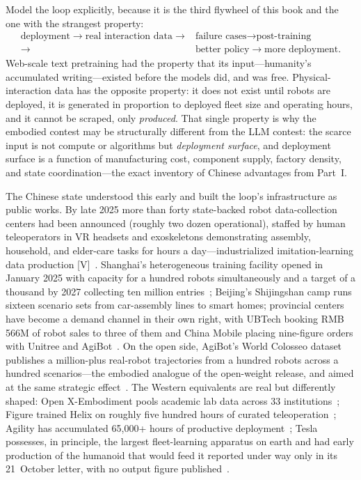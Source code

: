 Model the loop explicitly, because it is the third flywheel of this book and the one with the strangest property:
\begin{align*}
\text{deployment} \rightarrow \text{real interaction data} \rightarrow{}& \text{failure cases} \rightarrow \text{post-training}\\
\rightarrow{}& \text{better policy} \rightarrow \text{more deployment}.
\end{align*}
Web-scale text pretraining had the property that its input---humanity's accumulated writing---existed before the models did, and was free. Physical-interaction data has the opposite property: it does not exist until robots are deployed, it is generated in proportion to deployed fleet size and operating hours, and it cannot be scraped, only \emph{produced}. That single property is why the embodied contest may be structurally different from the LLM contest: the scarce input is not compute or algorithms but \emph{deployment surface}, and deployment surface is a function of manufacturing cost, component supply, factory density, and state coordination---the exact inventory of Chinese advantages from Part~I.

The Chinese state understood this early and built the loop's infrastructure as public works. By late 2025 more than forty state-backed robot data-collection centers had been announced (roughly two dozen operational), staffed by human teleoperators in VR headsets and exoskeletons demonstrating assembly, household, and elder-care tasks for hours a day---industrialized imitation-learning data production [V]~\cite{data-farms}. Shanghai's heterogeneous training facility opened in January 2025 with capacity for a hundred robots simultaneously and a target of a thousand by 2027 collecting ten million entries~\cite{kylin}; Beijing's Shijingshan camp runs sixteen scenario sets from car-assembly lines to smart homes; provincial centers have become a demand channel in their own right, with UBTech booking RMB\,566M of robot sales to three of them and China Mobile placing nine-figure orders with Unitree and AgiBot~\cite{data-farms}. On the open side, AgiBot's World Colosseo dataset publishes a million-plus real-robot trajectories from a hundred robots across a hundred scenarios---the embodied analogue of the open-weight release, and aimed at the same strategic effect~\cite{agibot-world}. The Western equivalents are real but differently shaped: Open X-Embodiment pools academic lab data across 33 institutions~\cite{open-x}; Figure trained Helix on roughly five hundred hours of curated teleoperation~\cite{helix}; Agility has accumulated 65{,}000+ hours of productive deployment~\cite{agility-spac}; Tesla possesses, in principle, the largest fleet-learning apparatus on earth and had early production of the humanoid that would feed it reported under way only in its 21~October letter, with no output figure published~\cite{optimus-zero,hw-tesla-q3}.

